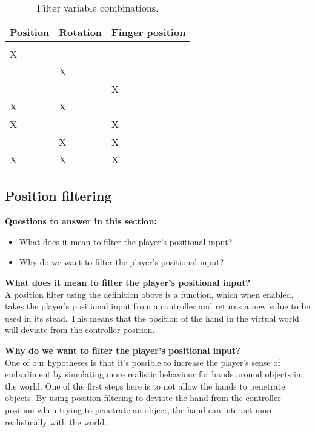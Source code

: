 \begin{table}[H]
\centering
\caption{Filter variable combinations.}
\label{tab:filterVariableCombinations}
\begin{tabular}{C{2cm}C{2cm}C{2cm}}
Position & Rotation & Finger position \\ \midrule \midrule
				&					&					\\ \midrule
\Large X	&					&					\\ \midrule
				& \Large X	& 		                \\ \midrule
				&					& \Large X     \\ \midrule
\Large X	& \Large X	&					\\ \midrule
\Large X 	&					& \Large X	\\ \midrule
				& \Large X	& \Large X	\\ \midrule
\Large X 	& \Large X 	& \Large X
\end{tabular}
\end{table}

\subsection{Position filtering}
\label{subsec:categoryPositionFiltering}
\textbf{Questions to answer in this section:}
\begin{itemize}
\item What does it mean to filter the player's positional input?
\item Why do we want to filter the player's positional input?
\end{itemize}

\textbf{What does it mean to filter the player's positional input?}\\
A position filter using the definition above is a function, which when enabled, takes the player's positional input from a controller and returns a new value to be used in its stead. This means that the position of the hand in the virtual world will deviate from the controller position.

\textbf{Why do we want to filter the player's positional input?}\\
One of our hypotheses is that it's possible to increase the player's sense of embodiment by simulating more realistic behaviour for hands around objects in the world. One of the first steps here is to not allow the hands to penetrate objects. By using position filtering to deviate the hand from the controller position when trying to penetrate an object, the hand can interact more realistically with the world.

